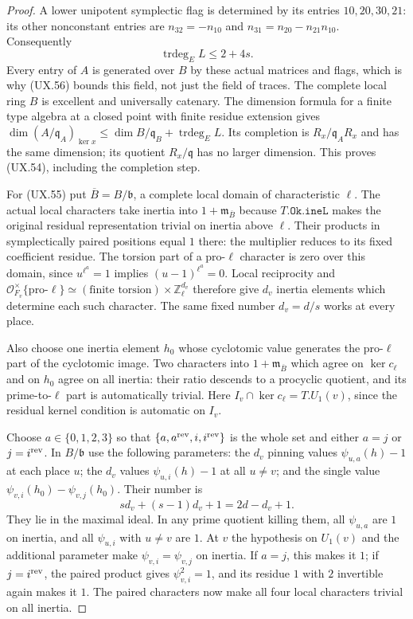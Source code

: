 \begin{proof}
A lower unipotent symplectic flag is
determined by its entries $10,20,30,21$:
its other nonconstant entries are
$n_{32}=-n_{10}$ and
$n_{31}=n_{20}-n_{21}n_{10}$.
Consequently
\[
                 \operatorname{trdeg}_E L\le2+4s .
 \tag{UX.56}
\]
Every entry of $A$ is generated over $B$
by these actual matrices and flags,
which is why (UX.56) bounds this field,
not just the field of traces.
The complete local ring $B$ is excellent
and universally catenary.  The dimension
formula for a finite type algebra at a
closed point with finite residue extension
gives
$\dim(A/\mathfrak q_A)_{\ker x}
 \le\dim B/\mathfrak q_B+
                 \operatorname{trdeg}_E L$.
Its completion is
$R_x/\mathfrak q_A R_x$ and has the
same dimension; its quotient
$R_x/\mathfrak q$ has no larger dimension.
This proves (UX.54), including the
completion step.

For (UX.55) put $\overline B=B/\mathfrak b$,
a complete local domain of characteristic
$\ell$.  The actual local characters
take inertia into $1+\mathfrak m_{\overline B}$
because $T.\mathtt{Ok.ineL}$ makes the
original residual representation trivial
on inertia above $\ell$.  Their products
in symplectically paired positions equal
$1$ there: the multiplier reduces to
its fixed coefficient residue.  The
torsion part of a pro-$\ell$ character
is zero over this domain, since
$u^{\ell^a}=1$ implies $(u-1)^{\ell^a}=0$.
Local reciprocity and
$\mathcal O_{F_v}^{\times}\{\text{pro-}\ell\}
 \simeq(\text{finite torsion})\times\mathbb Z_\ell^{d_v}$
therefore give $d_v$ inertia elements
which determine each such character.
The same fixed number $d_v=d/s$ works
at every place.

Also choose one inertia element $h_0$
whose cyclotomic value generates the
pro-$\ell$ part of the cyclotomic image.
Two characters into $1+\mathfrak m_{\overline B}$
which agree on $\ker c_\ell$ and on
$h_0$ agree on all inertia: their
ratio descends to a procyclic quotient,
and its prime-to-$\ell$ part is
automatically trivial.  Here
$I_v\cap\ker c_\ell=T.U_1(v)$,
since the residual kernel condition
is automatic on $I_v$.

Choose $a\in\{0,1,2,3\}$ so that
$\{a,a^{\rm rev},i,i^{\rm rev}\}$
is the whole set and either $a=j$
or $j=i^{\rm rev}$.  In $B/\mathfrak b$
use the following parameters:
the $d_v$ pinning values
$\psi_{u,a}(h)-1$ at each place $u$;
the $d_v$ values $\psi_{u,i}(h)-1$
at all $u\ne v$; and the single
value $\psi_{v,i}(h_0)-\psi_{v,j}(h_0)$.
Their number is
\[
               sd_v+(s-1)d_v+1=2d-d_v+1 .
 \tag{UX.57}
\]
They lie in the maximal ideal.  In
any prime quotient killing them,
all $\psi_{u,a}$ are $1$ on inertia,
and all $\psi_{u,i}$ with $u\ne v$
are $1$.  At $v$ the hypothesis on
$U_1(v)$ and the additional parameter
make $\psi_{v,i}=\psi_{v,j}$ on
inertia.  If $a=j$, this makes it
$1$; if $j=i^{\rm rev}$, the paired
product gives $\psi_{v,i}^2=1$,
and its residue $1$ with $2$ invertible
again makes it $1$.  The paired
characters now make all four local
characters trivial on all inertia.


\end{proof}
